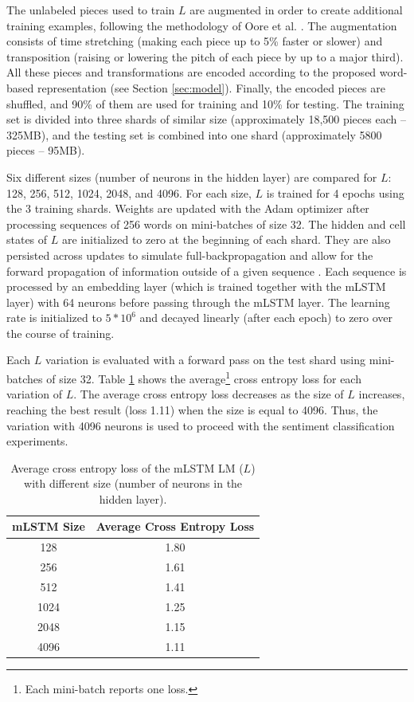 The unlabeled pieces used to train $L$ are augmented in order to create additional training examples, following the methodology of Oore et al. \cite{oore2017learning}. The augmentation consists of time stretching (making each piece up to 5\% faster or slower) and transposition (raising or lowering the pitch of each piece by up to a major third). All these pieces and transformations are encoded according to the proposed word-based representation (see Section \ref{sec:model}). Finally, the encoded pieces are shuffled, and 90\% of them are used for training and 10\% for testing. The training set is divided into three shards of similar size (approximately 18,500 pieces each -- 325MB), and the testing set is combined into one shard (approximately 5800 pieces -- 95MB).

Six different sizes (number of neurons in the hidden layer) are compared for $L$: 128, 256, 512, 1024, 2048, and 4096. For each size, $L$ is trained for 4 epochs using the 3 training shards. Weights are updated with the Adam optimizer after processing sequences of 256 words on mini-batches of size 32. The hidden and cell states of $L$ are initialized to zero at the beginning of each shard. They are also persisted across updates to simulate full-backpropagation and allow for the forward propagation of information outside of a given sequence \cite{radford_2017}. Each sequence is processed by an embedding layer (which is trained together with the mLSTM layer) with 64 neurons before passing through the mLSTM layer. The learning rate is initialized to $5*10^6$ and decayed linearly (after each epoch) to zero over the course of training.

Each $L$ variation is evaluated with a forward pass on the test shard using mini-batches of size 32. Table \ref{tab:gen_anal} shows the average\footnote{Each mini-batch reports one loss.} cross entropy loss for each variation of $L$. The average cross entropy loss decreases as the size of $L$ increases, reaching the best result (loss 1.11) when the size is equal to 4096. Thus, the variation with 4096 neurons is used to proceed with the sentiment classification experiments.

\begin{table}[!h]
 \begin{center}
 \begin{tabular}{cc}
  \hline
  \textbf{mLSTM Size} & \textbf{Average Cross Entropy Loss}\\ \hline
  128 & 1.80   \\
  256  & 1.61  \\
  512  & 1.41  \\
  1024 & 1.25  \\
  2048 & 1.15  \\
  4096 & 1.11  \\ \hline
 \end{tabular}
\end{center}
\caption{Average cross entropy loss of the mLSTM LM ($L$) with different size (number of neurons in the hidden layer).}
 \label{tab:gen_anal}
\end{table}

